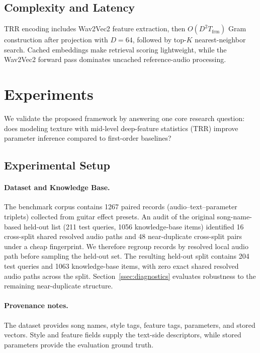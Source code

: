 \subsection{Complexity and Latency}
\label{ssec:complexity_latency}
TRR encoding includes Wav2Vec2 feature extraction, then $O(D^2T_{\mathrm{frm}})$ Gram construction after projection with $D=64$, followed by top-$K$ nearest-neighbor search. Cached embeddings make retrieval scoring lightweight, while the Wav2Vec2 forward pass dominates uncached reference-audio processing.

\section{Experiments}
\label{sec:experiments}

We validate the proposed framework by answering one core research question: does modeling texture with mid-level deep-feature statistics (TRR) improve parameter inference compared to first-order baselines?

\subsection{Experimental Setup}

\paragraph{Dataset and Knowledge Base.}
The benchmark corpus contains 1267 paired records (audio--text--parameter triplets) collected from guitar effect presets. An audit of the original song-name-based held-out list (211 test queries, 1056 knowledge-base items) identified 16 cross-split shared resolved audio paths and 48 near-duplicate cross-split pairs under a cheap fingerprint. We therefore regroup records by resolved local audio path before sampling the held-out set. The resulting held-out split contains 204 test queries and 1063 knowledge-base items, with zero exact shared resolved audio paths across the split. Section~\ref{ssec:diagnostics} evaluates robustness to the remaining near-duplicate structure.

\paragraph{Provenance notes.}
The dataset provides song names, style tags, feature tags, parameters, and stored vectors. Style and feature fields supply the text-side descriptors, while stored parameters provide the evaluation ground truth.

